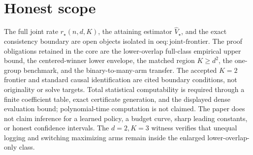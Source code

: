 \documentclass{article}
\begin{document}
\section{Honest scope}

The full joint rate \(r_\star(n,d,K)\), the attaining estimator \(\widehat V_\star\), and the exact consistency boundary are open objects isolated in \(\mathrm{oeq{:}joint\text{-}frontier}\). The proof obligations retained in the core are the lower-overlap full-class empirical upper bound, the centered-winner lower envelope, the matched region \(K\ge d^2\), the one-group benchmark, and the binary-to-many-arm transfer. The accepted \(K=2\) frontier and standard causal identification are cited boundary conditions, not originality or solve targets. Total statistical computability is required through a finite coefficient table, exact certificate generation, and the displayed dense evaluation bound; polynomial-time computation is not claimed. The paper does not claim inference for a learned policy, a budget curve, sharp leading constants, or honest confidence intervals. The \(d=2,K=3\) witness verifies that unequal logging and switching maximizing arms remain inside the enlarged lower-overlap-only class.
\end{document}
